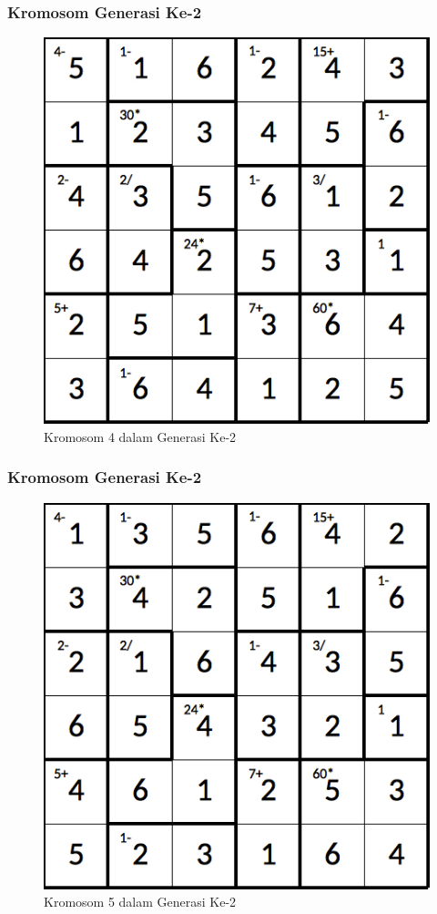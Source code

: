 \documentclass{beamer}
\begin{document}
\begin{frame}
\frametitle{Kromosom Generasi Ke-2}
\begin{figure}
\centering
\captionsetup{justification=centering}
\includegraphics[scale=0.333]{Gambar/hybridgenetic/Generation2Chromosome4}
\caption[Kromosom 4 dalam Generasi Ke-2]{Kromosom 4 dalam Generasi Ke-2}
\label{fig:analisisg2k4}
\end{figure}
\end{frame}

\note{

}

\begin{frame}
\frametitle{Kromosom Generasi Ke-2}
\begin{figure}
\centering
\captionsetup{justification=centering}
\includegraphics[scale=0.333]{Gambar/hybridgenetic/Generation2Chromosome5}
\caption[Kromosom 5 dalam Generasi Ke-2]{Kromosom 5 dalam Generasi Ke-2}
\label{fig:analisisg2k5}
\end{figure}
\end{frame}
\end{document}
